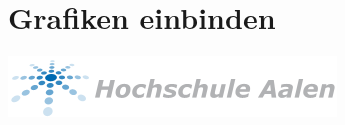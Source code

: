 \section{Grafiken einbinden}
\label{sec:grafiken}


\begin{center}
  \includegraphics[width=\textwidth]{Images/hs_aalen_logo}
\end{center}